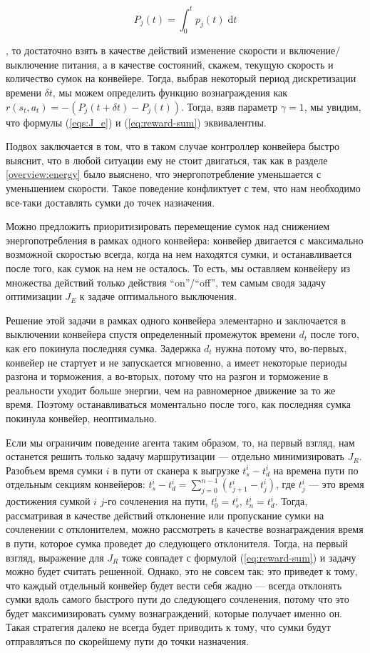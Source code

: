 \documentclass[specification,annotation,times]{itmo-student-thesis}
\theoremstyle{definition}
\begin{document}
\begin{equation}
  P_j(t) = \int_0^t \! p_j(t) \; \mathrm{d}t
\end{equation}

, то достаточно взять в качестве действий изменение скорости и
включение/выключение питания, а в качестве состояний, скажем, текущую скорость и
количество сумок на конвейере. Тогда, выбрав некоторый период дискретизации
времени $\delta t$, мы можем определить функцию вознаграждения как
$r(s_t, a_t) = - (P_j(t + \delta t) - P_j(t))$. Тогда, взяв параметр
$\gamma = 1$, мы увидим, что формулы (\ref{eqs:J_e}) и (\ref{eq:reward-sum})
эквивалентны.

Подвох заключается в том, что в таком случае контроллер конвейера быстро
выяснит, что в любой ситуации ему не стоит двигаться, так как в разделе
\ref{overview:energy} было выяснено, что энергопотребление уменьшается с
уменьшением скорости. Такое поведение конфликтует с тем, что нам необходимо
все-таки доставлять сумки до точек назначения.

Можно предложить приоритизировать перемещение сумок над снижением
энергопотребления в рамках одного конвейера: конвейер двигается с максимально
возможной скоростью всегда, когда на нем находятся сумки, и останавливается
после того, как сумок на нем не осталось. То есть, мы оставляем конвейеру из
множества действий только действия ``on''/``off'', тем самым сводя задачу
оптимизации $J_E$ к задаче оптимального выключения.

Решение этой задачи в рамках одного конвейера элементарно и заключается в
выключении конвейера спустя определенный промежуток времени $d_t$ после того,
как его покинула последняя сумка. Задержка $d_t$ нужна потому что, во-первых,
конвейер не стартует и не запускается мгновенно, а имеет некоторые периоды
разгона и торможения, а во-вторых, потому что на разгон и торможение в
реальности уходит больше энергии, чем на равномерное движение за то же время.
Поэтому останавливаться моментально после того, как последняя сумка покинула
конвейер, неоптимально.

Если мы ограничим поведение агента таким образом, то, на первый взгляд, нам
останется решить только задачу маршрутизации --- отдельно минимизировать $J_R$.
Разобъем время сумки $i$ в пути от сканера к выгрузке $t_s^i - t_d^i$ на времена
пути по отдельным секциям конвейеров:
$t_s^i - t_d^i = \sum\limits_{j=0}^{n-1} (t_{j+1}^i - t_j^i)$, где $t_j^i$ ---
это время достижения сумкой $i$ $j$-го сочленения на пути, $t_0^i = t_s^i$,
$t_n^i = t_d^i$. Тогда, рассматривая в качестве действий отклонение или
пропускание сумки на сочленении с отклонителем, можно рассмотреть в качестве
вознаграждения время в пути, которое сумка проведет до следующего отклонителя.
Тогда, на первый взгляд, выражение для $J_R$ тоже совпадет с формулой
(\ref{eq:reward-sum}) и задачу можно будет считать решенной. Однако, это не
совсем так: это приведет к тому, что каждый отдельный конвейер будет вести себя
жадно --- всегда отклонять сумки вдоль самого быстрого пути до следующего
сочленения, потому что это будет максимизировать сумму вознаграждений, которые
получает именно он. Такая стратегия далеко не всегда будет приводить к тому, что
сумки будут отправляться по скорейшему пути до точки назначения.
\end{document}
